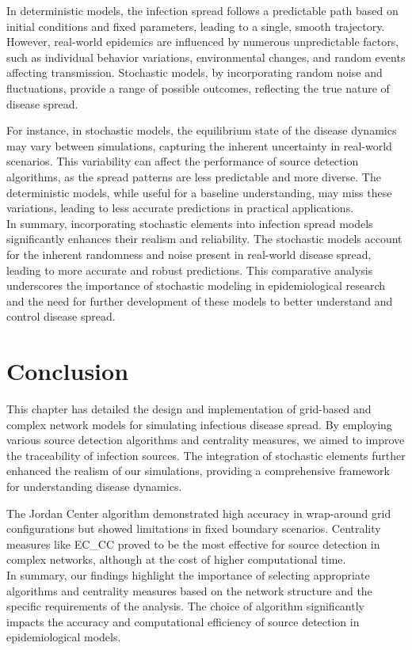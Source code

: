 In deterministic models, the infection spread follows a predictable path based on initial conditions and fixed parameters, leading to a single, smooth trajectory. However, real-world epidemics are influenced by numerous unpredictable factors, such as individual behavior variations, environmental changes, and random events affecting transmission. Stochastic models, by incorporating random noise and fluctuations, provide a range of possible outcomes, reflecting the true nature of disease spread.

For instance, in stochastic models, the equilibrium state of the disease dynamics may vary between simulations, capturing the inherent uncertainty in real-world scenarios. This variability can affect the performance of source detection algorithms, as the spread patterns are less predictable and more diverse. The deterministic models, while useful for a baseline understanding, may miss these variations, leading to less accurate predictions in practical applications.\\

In summary, incorporating stochastic elements into infection spread models significantly enhances their realism and reliability. The stochastic models account for the inherent randomness and noise present in real-world disease spread, leading to more accurate and robust predictions. This comparative analysis underscores the importance of stochastic modeling in epidemiological research and the need for further development of these models to better understand and control disease spread.

\section{Conclusion}

This chapter has detailed the design and implementation of grid-based and complex network models for simulating infectious disease spread. By employing various source detection algorithms and centrality measures, we aimed to improve the traceability of infection sources. The integration of stochastic elements further enhanced the realism of our simulations, providing a comprehensive framework for understanding disease dynamics.

The Jordan Center algorithm demonstrated high accuracy in wrap-around grid configurations but showed limitations in fixed boundary scenarios. Centrality measures like EC\_CC proved to be the most effective for source detection in complex networks, although at the cost of higher computational time.\\

In summary, our findings highlight the importance of selecting appropriate algorithms and centrality measures based on the network structure and the specific requirements of the analysis. The choice of algorithm significantly impacts the accuracy and computational efficiency of source detection in epidemiological models.